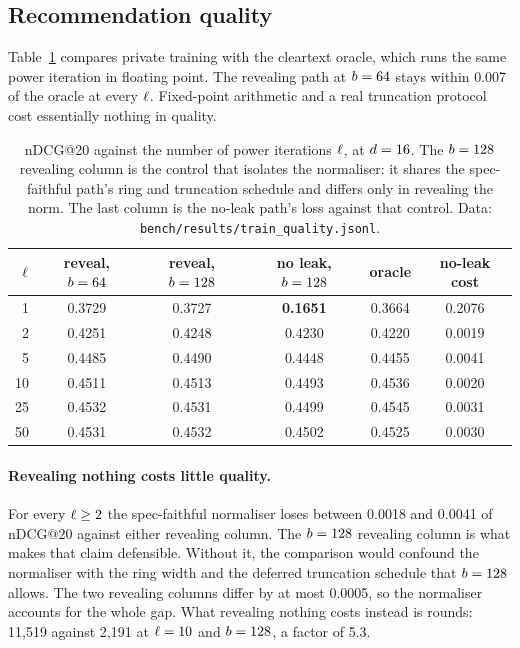 \subsection{Recommendation quality}
\label{sec:eval:quality}

Table~\ref{tab:quality} compares private training with the cleartext oracle, which
runs the same power iteration in floating point. The revealing path at
$b = 64$ stays within 0.007 of the oracle at every $\ell$. Fixed-point
arithmetic and a real truncation protocol cost essentially nothing in quality.

\begin{table}[t]
\centering
\small
\caption{nDCG@20 against the number of power iterations $\ell$, at $d = 16$.
The $b = 128$ revealing column is the control that isolates the normaliser:
it shares the spec-faithful path's ring and truncation schedule and differs only
in revealing the norm. The last column is the no-leak path's loss against that
control. Data: \texttt{bench/results/train\_quality.jsonl}.}
\label{tab:quality}
\begin{tabular}{@{}rccccc@{}}
\toprule
$\ell$ & reveal, $b = 64$ & reveal, $b = 128$ & \textbf{no leak},
  $b = 128$ & oracle & no-leak cost \\
\midrule
1  & 0.3729 & 0.3727 & \textbf{0.1651} & 0.3664 & 0.2076 \\
2  & 0.4251 & 0.4248 & 0.4230 & 0.4220 & 0.0019 \\
5  & 0.4485 & 0.4490 & 0.4448 & 0.4455 & 0.0041 \\
10 & 0.4511 & 0.4513 & 0.4493 & 0.4536 & 0.0020 \\
25 & 0.4532 & 0.4531 & 0.4499 & 0.4545 & 0.0031 \\
50 & 0.4531 & 0.4532 & 0.4502 & 0.4525 & 0.0030 \\
\bottomrule
\end{tabular}
\end{table}

\paragraph{Revealing nothing costs little quality.} For every $\ell \ge 2$ the
spec-faithful normaliser loses between 0.0018 and 0.0041 of nDCG@20 against
either revealing column. The $b = 128$ revealing column is what makes that
claim defensible. Without it, the comparison would confound the normaliser with
the ring width and the deferred truncation schedule that $b = 128$ allows.
The two revealing columns differ by at most 0.0005, so the normaliser accounts
for the whole gap. What revealing nothing costs instead is rounds: 11{,}519
against 2{,}191 at $\ell = 10$ and $b = 128$, a factor of 5.3.

